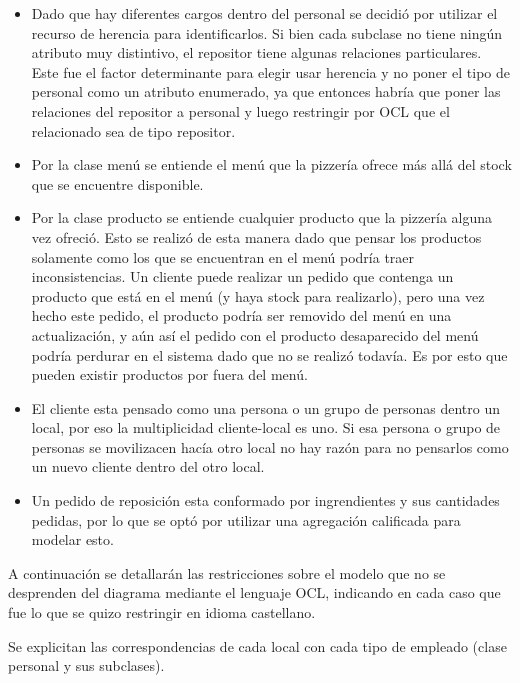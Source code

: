 \documentclass[a4paper,10pt]{article}
\begin{document}
\begin{itemize}
\item Dado que hay diferentes cargos dentro del personal se decidi\'o por utilizar el recurso de herencia para identificarlos. Si bien cada subclase
no tiene ning\'un atributo muy distintivo, el repositor tiene algunas relaciones particulares. Este fue el factor determinante para elegir usar herencia
y no poner el tipo de personal como un atributo enumerado, ya que entonces habr\'ia que poner las relaciones del repositor a personal y luego 
restringir por OCL que el relacionado sea de tipo repositor.
\item Por la clase men\'u se entiende el men\'u que la pizzer\'ia ofrece m\'as all\'a del stock que se encuentre disponible.
\item Por la clase producto se entiende cualquier producto que la pizzer\'ia alguna vez ofreci\'o. Esto se realiz\'o de esta manera dado que pensar 
los productos solamente como los que se encuentran en el men\'u podr\'ia traer inconsistencias. Un cliente puede realizar un pedido que contenga un producto
que est\'a en el men\'u (y haya stock para realizarlo), pero una vez hecho este pedido, el producto podr\'ia ser removido del men\'u en una actualizaci\'on,
y a\'un as\'i el pedido con el producto desaparecido del men\'u podr\'ia perdurar en el sistema dado que no se realiz\'o todav\'ia. Es por esto que
pueden existir productos por fuera del men\'u.
\item El cliente esta pensado como una persona o un grupo de personas dentro un local, por eso la multiplicidad cliente-local es uno. Si esa persona
o grupo de personas se movilizacen hac\'ia otro local no hay raz\'on para no pensarlos como un nuevo cliente dentro del otro local.
\item Un pedido de reposici\'on esta conformado por ingrendientes y sus cantidades pedidas, por lo que se opt\'o por utilizar una agregaci\'on calificada
para modelar esto.
\end{itemize}


\medskip

A continuaci\'on se detallar\'an las restricciones sobre el modelo que no se desprenden del diagrama mediante el lenguaje OCL, indicando en cada
caso que fue lo que se quizo restringir en idioma castellano.

\medskip

Se explicitan las correspondencias de cada local con cada tipo de empleado (clase personal y sus subclases).

\medskip
\end{document}

